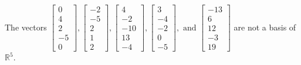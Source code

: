 \begin{exercise}
\begin{exerciseStatement}
  \end{exerciseStatement}
  \begin{exerciseAnswer}
   The vectors \(\left[\begin{array}{r}
0 \\
4 \\
2 \\
-5 \\
0
\end{array}\right] , \left[\begin{array}{r}
-2 \\
-5 \\
2 \\
1 \\
2
\end{array}\right] , \left[\begin{array}{r}
4 \\
-2 \\
-10 \\
13 \\
-4
\end{array}\right] , \left[\begin{array}{r}
3 \\
-4 \\
-2 \\
0 \\
-5
\end{array}\right] , \text{ and } \left[\begin{array}{r}
-13 \\
6 \\
12 \\
-3 \\
19
\end{array}\right]\) 
  	 are not  a basis of \(\mathbb{R}^5\).
  


  \end{exerciseAnswer}
\end{exercise}